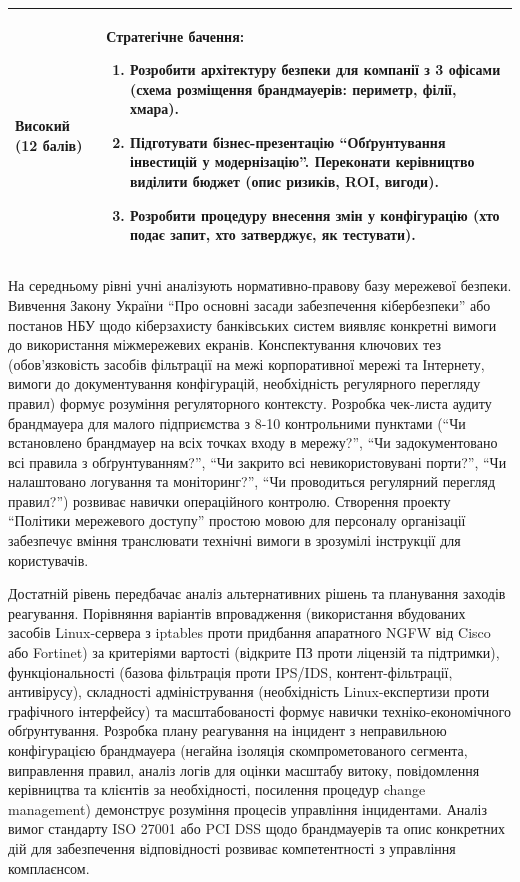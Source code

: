 \begin{table}[h!]
\begin{tabular}{
  | >{\raggedright\arraybackslash}p{} 
  | >{\raggedright\arraybackslash}p{} |
}
\cellcolor{TableBodyPeach}
\small \textbf{Високий} (12 балів) &
\small \textbf{Стратегічне бачення:}
\begin{enumerate}
    \item Розробити архітектуру безпеки для компанії з 3 офісами (схема розміщення брандмауерів: периметр, філії, хмара).
    \item Підготувати бізнес-презентацію ``Обґрунтування інвестицій у модернізацію''. Переконати керівництво виділити бюджет (опис ризиків, ROI, вигоди).
    \item Розробити процедуру внесення змін у конфігурацію (хто подає запит, хто затверджує, як тестувати).
\end{enumerate} \\ \hline

\end{tabular}
\end{table}

На середньому рівні учні аналізують нормативно-правову базу мережевої безпеки. Вивчення Закону України ``Про основні засади забезпечення кібербезпеки'' або постанов НБУ щодо кіберзахисту банківських систем виявляє конкретні вимоги до використання міжмережевих екранів. Конспектування ключових тез (обов'язковість засобів фільтрації на межі корпоративної мережі та Інтернету, вимоги до документування конфігурацій, необхідність регулярного перегляду правил) формує розуміння регуляторного контексту. Розробка чек-листа аудиту брандмауера для малого підприємства з 8-10 контрольними пунктами (``Чи встановлено брандмауер на всіх точках входу в мережу?'', ``Чи задокументовано всі правила з обґрунтуванням?'', ``Чи закрито всі невикористовувані порти?'', ``Чи налаштовано логування та моніторинг?'', ``Чи проводиться регулярний перегляд правил?'') розвиває навички операційного контролю. Створення проекту ``Політики мережевого доступу'' простою мовою для персоналу організації забезпечує вміння транслювати технічні вимоги в зрозумілі інструкції для користувачів.

Достатній рівень передбачає аналіз альтернативних рішень та планування заходів реагування. Порівняння варіантів впровадження (використання вбудованих засобів Linux-сервера з iptables проти придбання апаратного NGFW від Cisco або Fortinet) за критеріями вартості (відкрите ПЗ проти ліцензій та підтримки), функціональності (базова фільтрація проти IPS/IDS, контент-фільтрації, антивірусу), складності адміністрування (необхідність Linux-експертизи проти графічного інтерфейсу) та масштабованості формує навички техніко-економічного обґрунтування. Розробка плану реагування на інцидент з неправильною конфігурацією брандмауера (негайна ізоляція скомпрометованого сегмента, виправлення правил, аналіз логів для оцінки масштабу витоку, повідомлення керівництва та клієнтів за необхідності, посилення процедур change management) демонструє розуміння процесів управління інцидентами. Аналіз вимог стандарту ISO 27001 або PCI DSS щодо брандмауерів та опис конкретних дій для забезпечення відповідності розвиває компетентності з управління комплаєнсом.

